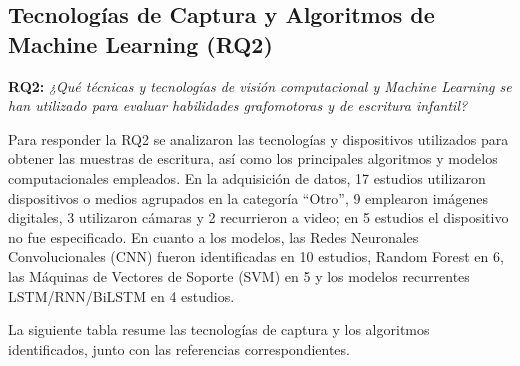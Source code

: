 \documentclass{iaesarticle}
\begin{document}
\subsection{Tecnologías de Captura y Algoritmos de Machine Learning (RQ2)}
\label{subsec:rq2}

\textbf{RQ2:} \textit{¿Qué técnicas y tecnologías de visión computacional y Machine Learning se han utilizado para evaluar habilidades grafomotoras y de escritura infantil?}

Para responder la RQ2 se analizaron las tecnologías y dispositivos utilizados para obtener las muestras de escritura, así como los principales algoritmos y modelos computacionales empleados. En la adquisición de datos, 17 estudios utilizaron dispositivos o medios agrupados en la categoría ``Otro'', 9 emplearon imágenes digitales, 3 utilizaron cámaras y 2 recurrieron a video; en 5 estudios el dispositivo no fue especificado. En cuanto a los modelos, las Redes Neuronales Convolucionales (CNN) fueron identificadas en 10 estudios, Random Forest en 6, las Máquinas de Vectores de Soporte (SVM) en 5 y los modelos recurrentes LSTM/RNN/BiLSTM en 4 estudios.

La siguiente tabla resume las tecnologías de captura y los algoritmos identificados, junto con las referencias correspondientes.
\end{document}
